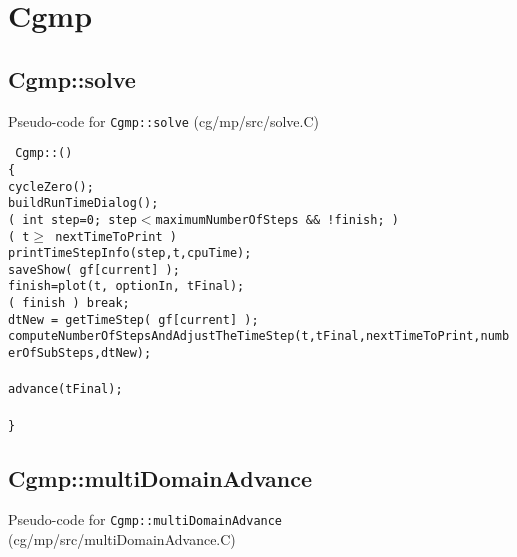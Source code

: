 \documentclass[11pt]{article}
\begin{document}
\section{Cgmp}

\subsection{Cgmp::solve}
Pseudo-code for {\tt Cgmp::solve} (cg/mp/src/solve.C)

\begin{flushleft}\tt\small
Cgmp::() \\
\{  \\
\ia  cycleZero(); \\
\ia  buildRunTimeDialog(); \\
\ia  \FOR( int step=0; step$<$maximumNumberOfSteps \&\& !finish;  ) \\
\ib    \IF( t$\ge$ nextTimeToPrint ) \\
\ic      printTimeStepInfo(step,t,cpuTime); \\
\ic      saveShow( gf[current] );  \\
\ic      finish=plot(t, optionIn, tFinal);   \\
\ic      \IF( finish ) break; \\
\ib    dtNew = getTimeStep( gf[current] );   \\
\ib    computeNumberOfStepsAndAdjustTheTimeStep(t,tFinal,nextTimeToPrint,numberOfSubSteps,dtNew); \\
\ib \\
\ib    advance(tFinal);   \\
\ib  \\
\}
\end{flushleft}


\clearpage
\subsection{Cgmp::multiDomainAdvance}\label{sec:Cgmp::multiDomainAdvance}

Pseudo-code for {\tt Cgmp::multiDomainAdvance} (cg/mp/src/multiDomainAdvance.C)
\end{document}
